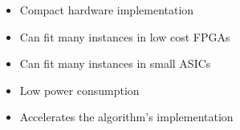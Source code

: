 \begin{itemize}
\item Compact hardware implementation
\item Can fit many instances in low cost FPGAs
\item Can fit many instances in small ASICs 
\item Low power consumption
\item Accelerates the algorithm's implementation
\end{itemize}
